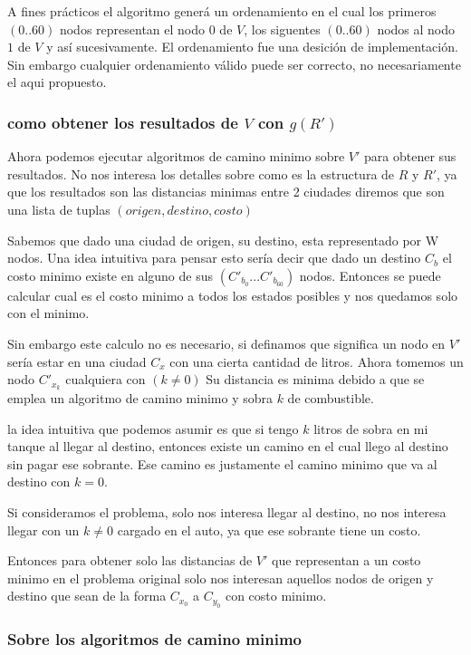 \documentclass[12pt]{article}
\begin{document}
A fines prácticos el algoritmo generá un ordenamiento en el cual los primeros $(0..60)$ nodos representan el nodo $0$ de $V$, los siguentes $(0..60)$ nodos al nodo $1$ de $V$ y así sucesivamente. El ordenamiento fue una desición de implementación. Sin embargo cualquier ordenamiento válido puede ser correcto, no necesariamente el aqui propuesto.

\subsubsection{como obtener los resultados de $V$ con $g(R')$}

Ahora podemos ejecutar algoritmos de camino minimo sobre $V'$ para obtener sus resultados. No nos interesa los detalles sobre como es la estructura de $R$ y $R'$, ya que los resultados son las distancias minimas entre 2 ciudades diremos que son una lista de tuplas $(origen, destino, costo)$

Sabemos que dado una ciudad de origen, su destino, esta representado por W nodos. Una idea intuitiva para pensar esto sería decir que dado un destino $C_b$ el costo minimo existe en alguno de sus $(C'_{b_0}...C'_{b_{60}})$ nodos. Entonces se puede calcular cual es el costo minimo a todos los estados posibles y nos quedamos solo con el minimo.

Sin embargo este calculo no es necesario, si definamos que significa un nodo en $V'$ sería estar en una ciudad $C_x$ con una cierta cantidad de litros. Ahora tomemos un nodo $C'_ {x_k}$ cualquiera con $(k \neq 0)$ Su distancia es minima debido a que se emplea un algoritmo de camino minimo y sobra $k$ de combustible.

la idea intuitiva que podemos asumir es que si tengo $k$ litros de sobra en mi tanque al llegar al destino, entonces existe un camino en el cual llego al destino sin pagar ese sobrante. Ese camino es justamente el camino minimo que va al destino con $k = 0$.   

Si consideramos el problema, solo nos interesa llegar al destino, no nos interesa llegar con un $k \neq 0$ cargado en el auto, ya que ese sobrante tiene un costo.

Entonces para obtener solo las distancias de $V'$ que representan a un costo minimo en el problema original solo nos interesan aquellos nodos de origen y destino que sean de la forma 
$C_{x_0}$ a $C_{y_0}$ con costo minimo.


\subsubsection{Sobre los algoritmos de camino minimo}
\end{document}
